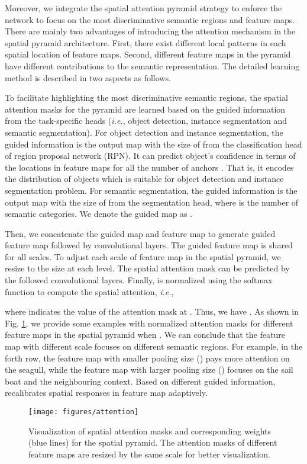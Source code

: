 \documentclass[runningheads]{llncs}
\def\ie{{\em i.e.}}
\begin{document}
{}
Moreover, we integrate the spatial attention pyramid strategy to enforce the network to focus on the most discriminative semantic regions and feature maps. There are mainly two advantages of introducing the attention mechanism in the spatial pyramid architecture. First, there exist different local patterns in each spatial location of feature maps. Second, different feature maps in the pyramid have different contributions to the semantic representation. The detailed learning method is described in two aspects as follows.

To facilitate highlighting the most discriminative semantic regions, the spatial attention masks for the pyramid  are learned based on the guided information from the task-specific heads (\ie, object detection, instance segmentation and semantic segmentation). For object detection and instance segmentation, the guided information is the output map with the size of  from the classification head of region proposal network (RPN). It can predict object's confidence in terms of the locations in feature maps for all the number of anchors . That is, it encodes the distribution of objects which is suitable for object detection and instance segmentation problem. For semantic segmentation, the guided information is the output map with the size of  from the segmentation head, where  is the number of semantic categories. We denote the guided map as .

Then, we concatenate the guided map  and feature map  to generate guided feature map  followed by  convolutional layers. The guided feature map  is shared for all  scales. To adjust each scale of feature map  in the spatial pyramid, we resize  to the size  at each level. The spatial attention mask  can be predicted by the followed  convolutional layers. Finally,  is normalized using the softmax function to compute the spatial attention, \ie,

where  indicates the value of the attention mask  at . Thus, we have .
As shown in Fig. \ref{fig:spatial}, we provide some examples with normalized attention masks  for different feature maps in the spatial pyramid when . We can conclude that the feature map with different scale  focuses on different semantic regions. For example, in the forth row, the feature map with smaller pooling size () pays more attention on the seagull, while the feature map with larger pooling size () focuses on the sail boat and the neighbouring context. Based on different guided information,  recalibrates spatial responses in feature map  adaptively.
\begin{figure}[t]
\centering
\texttt{[image: figures/attention]}
\caption{Visualization of spatial attention masks and corresponding weights (blue lines) for the spatial pyramid. The attention masks of different feature maps are resized by the same scale for better visualization.}
\label{fig:spatial}
\end{figure}
\end{document}
